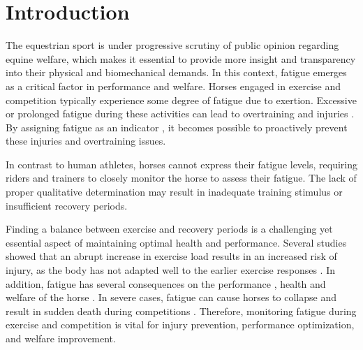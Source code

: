 \section{Introduction}
\label{sec:intro_introduction}

The equestrian sport is under progressive scrutiny of public opinion regarding equine welfare, which makes it essential to provide more insight and transparency into their physical and biomechanical demands. In this context, fatigue emerges as a critical factor in performance and welfare. Horses engaged in exercise and competition typically experience some degree of fatigue due to exertion. Excessive or prolonged fatigue during these activities can lead to overtraining and injuries \cite{graaf232}. By assigning fatigue as an indicator \cite{Takahashi2018ElectromyographicExercise},  it becomes possible to proactively prevent these injuries and overtraining issues. 

In contrast to human athletes, horses cannot express their fatigue levels, requiring riders and trainers to closely monitor the horse to assess their fatigue. The lack of proper qualitative determination may result in inadequate training stimulus or insufficient recovery periods. 

Finding a balance between exercise and recovery periods is a challenging yet essential aspect of maintaining optimal health and performance. Several studies showed that an abrupt increase in exercise load results in an increased risk of injury, as the body has not adapted well to the earlier exercise responses  \cite{Munsters2020AStudy}. In addition, fatigue has several consequences on the performance \cite{Arfuso2021PeripheralHorses,Ropka-Molik2019TheHorses,Rivero2001CoordinatedTraining.}, health and welfare of the horse \cite{Hogg2021SymbiosisSports}. In severe cases, fatigue can cause horses to collapse and result in sudden death during competitions \cite{verheyenarticle}. Therefore, monitoring fatigue during exercise and competition is vital for injury prevention, performance optimization, and welfare improvement. 

